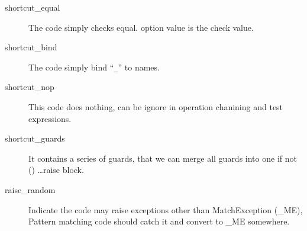 \documentclass[a4paper,11pt]{article}
\begin{document}
\begin{description}

\item[shortcut\_equal]
The code simply checks equal. option value is the check value.

\item[shortcut\_bind]
The code simply bind ``\verb|_|'' to names.

\item[shortcut\_nop]
This code does nothing, can be ignore in operation chanining and test expressions.

\item[shortcut\_guards]
It contains a series of guards, that we can merge all guards into one if not () \ldots raise block.

\item[raise\_random]
Indicate the code may raise exceptions other than MatchException (\_ME), Pattern matching code should catch it and convert to \_ME somewhere.

\end{description}
\end{document}
